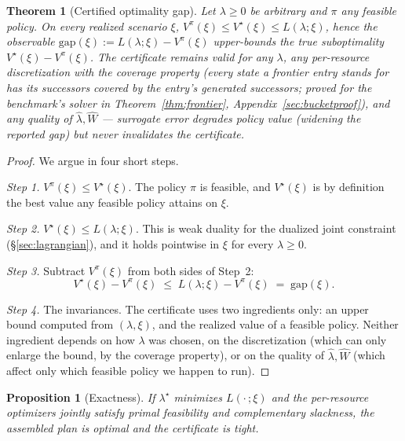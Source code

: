 \documentclass[11pt]{article}
\newtheorem{theorem}{Theorem}
\newtheorem{proposition}{Proposition}
\newcommand{\Vstar}{V^{\star}}
\begin{document}
\begin{theorem}[Certified optimality gap]
\label{thm:cert}
Let $\lambda \geq 0$ be arbitrary and $\pi$ any feasible policy. On
every realized scenario $\xi$,
$V^{\pi}(\xi) \leq \Vstar(\xi) \leq L(\lambda; \xi)$, hence the
observable $\mathrm{gap}(\xi) := L(\lambda; \xi) - V^{\pi}(\xi)$
upper-bounds the true suboptimality $\Vstar(\xi) - V^{\pi}(\xi)$. The
certificate remains valid for any $\lambda$, any per-resource
discretization with the \emph{coverage} property (every state a
frontier entry stands for has its successors covered by the entry's
generated successors; proved for the benchmark's solver in
Theorem~\ref{thm:frontier}, Appendix~\ref{sec:bucketproof}),
and any quality of
$\hat{\lambda}, \widehat{W}$ --- surrogate error degrades policy value
(widening the reported gap) but never invalidates the certificate.
\end{theorem}

\begin{proof}
We argue in four short steps.

\emph{Step 1.} $V^{\pi}(\xi) \leq \Vstar(\xi)$. The policy $\pi$
is feasible, and $\Vstar(\xi)$ is by definition the best value any
feasible policy attains on $\xi$.

\emph{Step 2.} $\Vstar(\xi) \leq L(\lambda; \xi)$. This is weak
duality for the dualized joint constraint (\S\ref{sec:lagrangian}),
and it holds pointwise in $\xi$ for every $\lambda \geq 0$.

\emph{Step 3.} Subtract $V^{\pi}(\xi)$ from both sides of Step~2:
\[
  \Vstar(\xi) - V^{\pi}(\xi) \;\leq\; L(\lambda; \xi) - V^{\pi}(\xi)
  \;=\; \mathrm{gap}(\xi).
\]

\emph{Step 4.} The invariances. The certificate uses two ingredients
only: an upper bound computed from $(\lambda, \xi)$, and the realized
value of a feasible policy. Neither ingredient depends on how $\lambda$
was chosen, on the discretization (which can only enlarge the bound,
by the coverage property), or on the quality of
$\hat{\lambda}, \widehat{W}$ (which affect only which feasible policy
we happen to run).
\end{proof}

\begin{proposition}[Exactness]
\label{prop:exact}
If $\lambda^{\star}$ minimizes $L(\cdot\,; \xi)$ and the per-resource
optimizers jointly satisfy primal feasibility and complementary
slackness, the assembled plan is optimal and the certificate is tight.
\end{proposition}
\end{document}
